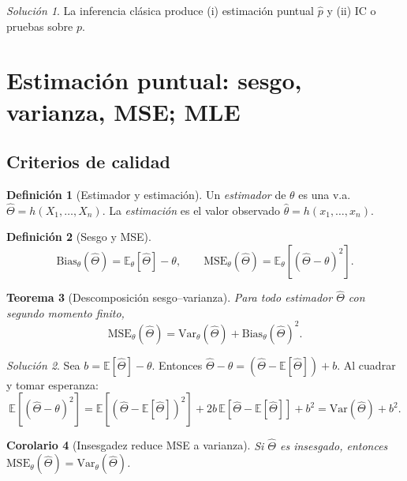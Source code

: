 \documentclass[11pt]{article}
\theoremstyle{plain}
\newtheorem{theorem}{Teorema}[section]
\newtheorem{corollary}[theorem]{Corolario}
\theoremstyle{definition}
\newtheorem{definition}[theorem]{Definición}
\theoremstyle{remark}
\theoremstyle{solstyle}
\newtheorem*{solution}{Solución}
\newcommand{\E}{\mathbb{E}}
\newcommand{\Var}{\mathrm{Var}}
\newcommand{\1}{\mathbbm{1}}
\begin{document}
\begin{solution}
La inferencia clásica produce (i) estimación puntual $\widehat p$ y (ii) IC o pruebas sobre $p$.
\end{solution}

\section{Estimación puntual: sesgo, varianza, MSE; MLE}

\subsection{Criterios de calidad}

\begin{definition}[Estimador y estimación]
Un \emph{estimador} de $\theta$ es una v.a.\ $\widehat\Theta=h(X_1,\dots,X_n)$.
La \emph{estimación} es el valor observado $\widehat\theta=h(x_1,\dots,x_n)$.
\end{definition}

\begin{definition}[Sesgo y MSE]
\[
\mathrm{Bias}_\theta(\widehat\Theta)=\E_\theta[\widehat\Theta]-\theta,
\qquad
\mathrm{MSE}_\theta(\widehat\Theta)=\E_\theta\!\left[(\widehat\Theta-\theta)^2\right].
\]
\end{definition}

\begin{theorem}[Descomposición sesgo--varianza]\label{thm:biasvar}
Para todo estimador $\widehat\Theta$ con segundo momento finito,
\[
\mathrm{MSE}_\theta(\widehat\Theta)=\Var_\theta(\widehat\Theta)+\mathrm{Bias}_\theta(\widehat\Theta)^2.
\]
\end{theorem}

\begin{solution}
Sea $b=\E[\widehat\Theta]-\theta$. Entonces
$\widehat\Theta-\theta=(\widehat\Theta-\E[\widehat\Theta])+b$.
Al cuadrar y tomar esperanza:
\[
\E[(\widehat\Theta-\theta)^2]
=\E[(\widehat\Theta-\E[\widehat\Theta])^2] + 2b\,\E[\widehat\Theta-\E[\widehat\Theta]] + b^2
=\Var(\widehat\Theta)+b^2.
\]
\end{solution}

\begin{corollary}[Insesgadez reduce MSE a varianza]\label{cor:unbiasedMSE}
Si $\widehat\Theta$ es insesgado, entonces $\mathrm{MSE}_\theta(\widehat\Theta)=\Var_\theta(\widehat\Theta)$.
\end{corollary}
\end{document}
